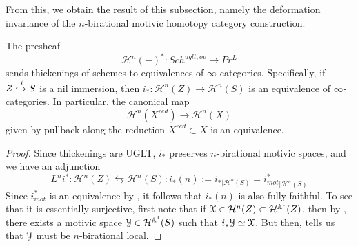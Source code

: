 From this, we obtain the result of this subsection, namely the deformation invariance of the $n$-birational motivic homotopy category construction.
\begin{thm}\label{deformation invariant}
The presheaf $$\mathcal{H}^{n}(-)^*: Sch^{uglt,op}\to Pr^L$$ sends thickenings of schemes to equivalences of $\infty$-categories. Specifically, if $Z\xhookrightarrow{i} S$ is a nil immersion, then $i_*:  \mathcal{H}^{n}(Z) \to \mathcal{H}^{n}(S)$ is an equivalence of $\infty$-categories. In particular, the canonical map $$\mathcal{H}^{n}(X^{red})\to \mathcal{H}^{n}(X)$$ given by pullback along the reduction $X^{red}\subset X$ is an equivalence.
    \end{thm}
\begin{proof}
Since thickenings are UGLT, $i_*$ preserves $n$-birational motivic spaces, and we have an adjunction 
$$L^ni^*:\mathcal{H}^n(Z)\leftrightarrows \mathcal{H}^n(S):i_*(n):= {i_*}_{|\mathcal{H}^n(S)}={i_{mot}^*}_{|\mathcal{H}^n{(S)}}$$
Since ${i_{mot}^*}$ is an equivalence by , it follows that $i_*(n)$ is also fully faithful. To see that it is essentially surjective, first note that if $\EuScript{X}\in \mathcal{H}^{n}(Z)\subset \mathcal{H}^{\mathbb{A}^1}(Z)$, then by , there exists a motivic space $\EuScript{Y}\in \mathcal{H}^{\mathbb{A}^1}(S)$ such that $i_*\EuScript{Y}\simeq \EuScript{X}$. But then,  tells us that $\EuScript{Y}$ must be $n$-birational local.
\end{proof}
